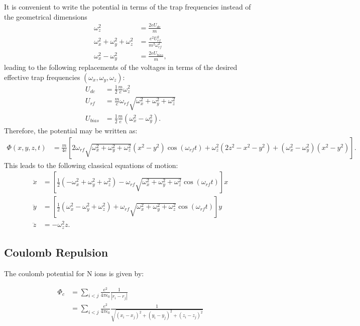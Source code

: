\documentclass[a4paper,10pt]{article}
\begin{document}
It is convenient to write the potential in terms of the trap frequencies instead of the geometrical dimensions
\begin{align}
\omega_z^2&=\frac{2eU_{dc}}{m}\\
\omega_x^2+\omega_y^2+\omega_z^2&=\frac{e^2U_{rf}^2}{m^2\omega_{rf}^2}\\
\omega_x^2-\omega_y^2&=\frac{2eU_{bias}}{m},
\end{align}
leading to the following replacements of the voltages in terms of the desired effective trap frequencies $(\omega_x, \omega_y, \omega_z)$:
\begin{align}
U_{dc}&=\frac{1}{2}\frac{m}{e}\omega_z^2\\
U_{rf}&=\frac{m}{e}\omega_{rf}\sqrt{\omega_x^2+\omega_y^2+\omega_z^2}\\
U_{bias}&=\frac{1}{2}\frac{m}{e}(\omega_x^2-\omega_y^2).
\end{align}
Therefore, the potential may be written as:
\begin{align}
 \Phi(x,y,z,t) &= \frac{m}{4e} \left[2 \omega_{rf} \sqrt{\omega_x^2 + \omega_y^2 + \omega_z^2} \left( x^2 - y^2 \right) \cos (\omega_{rf} t)
+\omega_z^2 (2z^2 - x^2 - y^2) + \left( \omega_x^2 - \omega_y^2 \right) (x^2 - y^2) \right].
\end{align}
This leads to the following classical equations of motion:
\begin{align}
\ddot{x}&=\left[\frac{1}{2}(-\omega_x^2+\omega_y^2+\omega_z^2)-\omega_{rf}\sqrt{\omega_x^2+\omega_y^2+\omega_z^2}\cos(\omega_{rf}t)\right]x\\
\ddot{y}&=\left[\frac{1}{2}(\omega_x^2-\omega_y^2+\omega_z^2)+\omega_{rf}\sqrt{\omega_x^2+\omega_y^2+\omega_z^2}\cos(\omega_{rf}t)\right]y\\
\ddot{z}&=-\omega_z^2z.
\end{align}

\subsection{Coulomb Repulsion}

The coulomb potential for N ions is given by:

\begin{align}
 \Phi_c &= \displaystyle\sum_{i < j}\frac{e^2}{4 \pi \epsilon_0} \frac{1}{| r_i - r_j |} \\
	&= \displaystyle\sum_{i < j}\frac{e^2}{4 \pi \epsilon_0} \frac{1}{\sqrt{(x_i - x_j)^2 + (y_i - y_j)^2 +  (z_i - z_j)^2}}
\end{align}
\end{document}
